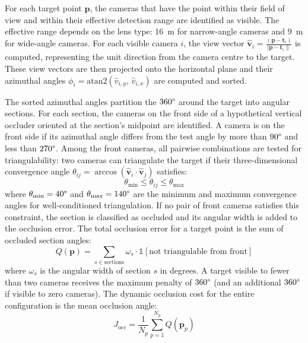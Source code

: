 For each target point $\mathbf{p}$, the cameras that have the point within their field of view and within their effective detection range are identified as visible. The effective range depends on the lens type: 16~m for narrow-angle cameras and 9~m for wide-angle cameras. For each visible camera $i$, the view vector $\hat{\mathbf{v}}_i = \frac{(\mathbf{p} - \mathbf{t}_i)}{|\mathbf{p} - \mathbf{t}_i\|} $ is computed, representing the unit direction from the camera centre to the target. These view vectors are then projected onto the horizontal plane and their azimuthal angles $\phi_i = \text{atan2}(\hat{v}_{i,y},\, \hat{v}_{i,x})$ are computed and sorted.

The sorted azimuthal angles partition the $360\degree$ around the target into angular sections. For each section, the cameras on the front side of a hypothetical vertical occluder oriented at the section's midpoint are identified. A camera is on the front side if its azimuthal angle differs from the test angle by more than $90\degree$ and less than $270\degree$. Among the front cameras, all pairwise combinations are tested for triangulability: two cameras can triangulate the target if their three-dimensional convergence angle $\theta_{ij} = \arccos(\hat{\mathbf{v}}_i \cdot \hat{\mathbf{v}}_j)$ satisfies:
%
\begin{equation}
\label{eq:triangulability}
\theta_{\min} \leq \theta_{ij} \leq \theta_{\max}
\end{equation}
%
where $\theta_{\min} = 40\degree$ and $\theta_{\max} = 140\degree$ are the minimum and maximum convergence angles for well-conditioned triangulation. If no pair of front cameras satisfies this constraint, the section is classified as occluded and its angular width is added to the occlusion error. The total occlusion error for a target point is the sum of occluded section angles:
%
\begin{equation}
\label{eq:occlusion-point}
Q(\mathbf{p}) = \sum_{s \in \text{sections}} \omega_s \cdot \mathbb{1}[\text{not triangulable from front}]
\end{equation}
%
where $\omega_s$ is the angular width of section $s$ in degrees. A target visible to fewer than two cameras receives the maximum penalty of $360\degree$ (and an additional $360\degree$ if visible to zero cameras). The dynamic occlusion cost for the entire configuration is the mean occlusion angle:
%
\begin{equation}
\label{eq:occlusion-cost}
J_{\text{occ}} = \frac{1}{N_p} \sum_{p=1}^{N_p} Q(\mathbf{p}_p)
\end{equation}

